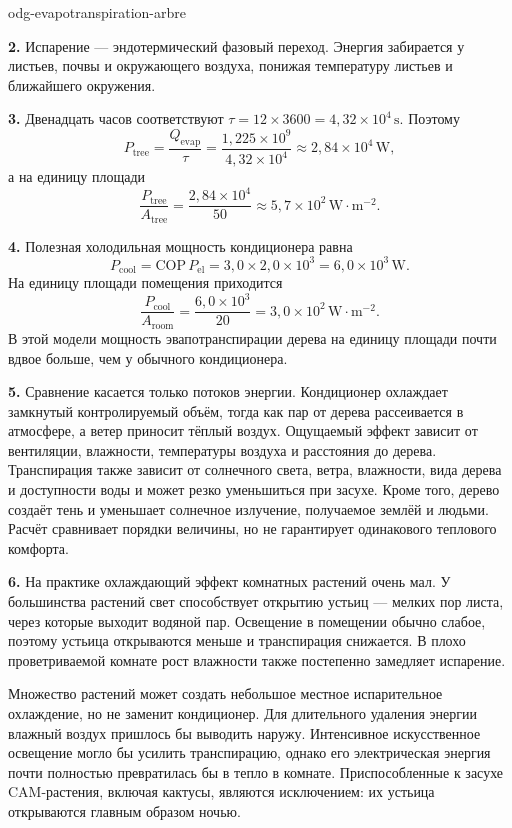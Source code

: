 \begin{exo}{odg-evapotranspiration-arbre}
\begin{solution}
\textbf{2.} Испарение — эндотермический фазовый переход. Энергия забирается у листьев, почвы и окружающего воздуха, понижая температуру листьев и ближайшего окружения.

\textbf{3.} Двенадцать часов соответствуют $\tau=12\times3600=4{,}32\times10^4\,\text{s}$. Поэтому
\[
P_{\text{tree}}=\frac{Q_{\mathrm{evap}}}{\tau}
=\frac{1{,}225\times10^9}{4{,}32\times10^4}
\approx2{,}84\times10^4\,\text{W},
\]
а на единицу площади
\[
\frac{P_{\text{tree}}}{A_{\text{tree}}}
=\frac{2{,}84\times10^4}{50}
\approx5{,}7\times10^2\,\text{W}\!\cdot\!\text{m}^{-2}.
\]

\textbf{4.} Полезная холодильная мощность кондиционера равна
\[
P_{\text{cool}}=\mathrm{COP}\,P_{\mathrm{el}}
=3{,}0\times2{,}0\times10^3=6{,}0\times10^3\,\text{W}.
\]
На единицу площади помещения приходится
\[
\frac{P_{\text{cool}}}{A_{\text{room}}}
=\frac{6{,}0\times10^3}{20}
=3{,}0\times10^2\,\text{W}\!\cdot\!\text{m}^{-2}.
\]
В этой модели мощность эвапотранспирации дерева на единицу площади почти вдвое больше, чем у обычного кондиционера.

\textbf{5.} Сравнение касается только потоков энергии. Кондиционер охлаждает замкнутый контролируемый объём, тогда как пар от дерева рассеивается в атмосфере, а ветер приносит тёплый воздух. Ощущаемый эффект зависит от вентиляции, влажности, температуры воздуха и расстояния до дерева. Транспирация также зависит от солнечного света, ветра, влажности, вида дерева и доступности воды и может резко уменьшиться при засухе. Кроме того, дерево создаёт тень и уменьшает солнечное излучение, получаемое землёй и людьми. Расчёт сравнивает порядки величины, но не гарантирует одинакового теплового комфорта.

\textbf{6.} На практике охлаждающий эффект комнатных растений очень мал. У большинства растений свет способствует открытию устьиц — мелких пор листа, через которые выходит водяной пар. Освещение в помещении обычно слабое, поэтому устьица открываются меньше и транспирация снижается. В плохо проветриваемой комнате рост влажности также постепенно замедляет испарение.

Множество растений может создать небольшое местное испарительное охлаждение, но не заменит кондиционер. Для длительного удаления энергии влажный воздух пришлось бы выводить наружу. Интенсивное искусственное освещение могло бы усилить транспирацию, однако его электрическая энергия почти полностью превратилась бы в тепло в комнате. Приспособленные к засухе CAM-растения, включая кактусы, являются исключением: их устьица открываются главным образом ночью.
\end{solution}
\end{exo}

